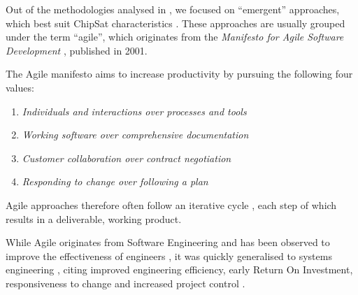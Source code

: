 \documentclass[]{iac}
\begin{document}
    Out of the methodologies analysed in , we focused on ``emergent'' approaches, which best suit ChipSat characteristics \autocite{sebok}. These approaches are usually grouped under the term ``agile'', which originates from the \emph{Manifesto for Agile Software Development} \autocite{beck_agile_2001}, published in 2001.%

    

    The Agile manifesto aims to increase productivity by pursuing the following four values: \autocite{beck_agile_2001}
    \begin{enumerate}[itemsep=0pt]
        \item \emph{Individuals and interactions over processes and tools}
        \item \emph{Working software over comprehensive documentation}
        \item \emph{Customer collaboration over contract negotiation}
        \item \emph{Responding to change over following a plan}
    \end{enumerate}
    Agile approaches therefore often follow an iterative cycle \autocite{HEEAGER201822}, each step of which results in a deliverable, working product. 

    While Agile originates from Software Engineering and has been observed to improve the effectiveness of engineers \autocite{noauthor_15th_nodate,noauthor_status_nodate}, it was quickly generalised to systems engineering \autocite{haberfellner_agile_2005}, citing improved engineering efficiency, early Return On Investment, responsiveness to change and increased project control \autocite{douglass_agile_2015,kohlbacher_agile_2011,darrin_agile_2017}.
\end{document}
